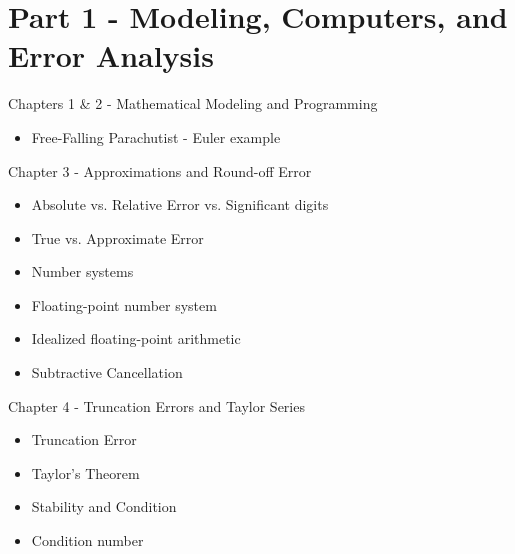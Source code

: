 \documentclass[12pt]{beamer}
\begin{document}
\section{Part 1 - Modeling, Computers, and Error Analysis}

\begin{frame}{Chapters 1 \& 2 - Mathematical Modeling and Programming}

\begin{itemize}

\item{Free-Falling Parachutist - Euler example}


\end{itemize}

\end{frame}

\begin{frame}{Chapter 3 - Approximations and Round-off Error}

\begin{itemize}

\item{Absolute vs. Relative Error vs. Significant digits} 

\item{True vs. Approximate Error}

\item{Number systems}

\item{Floating-point number system} 

\item{Idealized floating-point arithmetic} 

\item{Subtractive Cancellation}


\end{itemize}

\end{frame}

\begin{frame}{Chapter 4 - Truncation Errors and Taylor Series}

\begin{itemize}

\item{Truncation Error}

\item{Taylor's Theorem}

\item{Stability and Condition} 

\item{Condition number} 

\end{itemize}

\end{frame}
\end{document}
